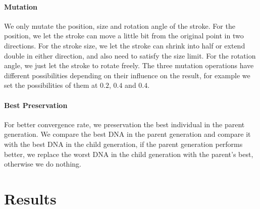 \documentclass[a4paper,conference]{IEEEtran}
\begin{document}
\paragraph{Mutation} We only mutate the position, size and rotation angle of the stroke. For the position, we let the stroke can move a little bit from the original point in two directions. For the stroke size, we let the stroke can shrink into half or extend double in either direction, and also need to satisfy the size limit. For the rotation angle, we just let the stroke to rotate freely. The three mutation operations have different possibilities depending on their influence on the result, for example we set the possibilities of them at $0.2$, $0.4$ and $0.4$.

\paragraph{Best Preservation} For better convergence rate, we preservation the best individual in the parent generation. We compare the best DNA in the parent generation and compare it with the best DNA in the child generation, if the parent generation performs better, we replace the worst DNA in the child generation with the parent's best, otherwise we do nothing.

\section{Results}
\end{document}
